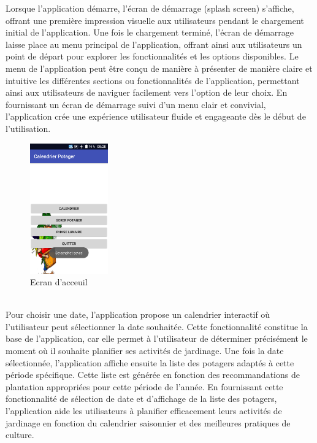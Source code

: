 Lorsque l'application démarre, l'écran de démarrage (splash screen) s'affiche, offrant une première impression visuelle aux utilisateurs pendant le chargement initial de l'application. Une fois le chargement terminé, l'écran de démarrage laisse place au menu principal de l'application, offrant ainsi aux utilisateurs un point de départ pour explorer les fonctionnalités et les options disponibles. Le menu de l'application peut être conçu de manière à présenter de manière claire et intuitive les différentes sections ou fonctionnalités de l'application, permettant ainsi aux utilisateurs de naviguer facilement vers l'option de leur choix. En fournissant un écran de démarrage suivi d'un menu clair et convivial, l'application crée une expérience utilisateur fluide et engageante dès le début de l'utilisation.\\
	\begin{figure}[!h]
    	\center
    		\includegraphics[width=0.3\textwidth]{image/2}
   		\caption{Ecran d'acceuil}
    	\label{Ecran d'acceuil}
	\end{figure}\\
Pour choisir une date, l'application propose un calendrier interactif où l'utilisateur peut sélectionner la date souhaitée. Cette fonctionnalité constitue la base de l'application, car elle permet à l'utilisateur de déterminer précisément le moment où il souhaite planifier ses activités de jardinage. Une fois la date sélectionnée, l'application affiche ensuite la liste des potagers adaptés à cette période spécifique. Cette liste est générée en fonction des recommandations de plantation appropriées pour cette période de l'année. En fournissant cette fonctionnalité de sélection de date et d'affichage de la liste des potagers, l'application aide les utilisateurs à planifier efficacement leurs activités de jardinage en fonction du calendrier saisonnier et des meilleures pratiques de culture.\\
